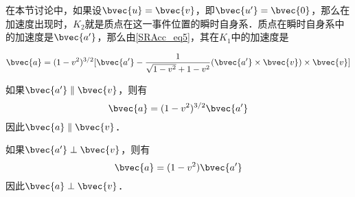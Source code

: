 在本节讨论中，如果设$\bvec{u}=\bvec{v}$，即$\bvec{u'}=\bvec{0}$，那么在加速度出现时，$K_2$就是质点在这一事件位置的瞬时自身系．质点在瞬时自身系中的加速度是$\bvec{a'}$，那么由\autoref{SRAcc_eq5}，其在$K_1$中的加速度是

\begin{equation}
\bvec{a}=(1-v^2)^{3/2}[\bvec{a'}-\frac{1}{\sqrt{1-v^2}+1-v^2}(\bvec{a'}\times\bvec{v})\times\bvec{v}]
\end{equation}

如果$\bvec{a'}\parallel \bvec{v}$，则有$$\bvec{a}=(1-v^2)^{3/2}\bvec{a'}$$因此$\bvec{a}\parallel\bvec{v}$．

如果$\bvec{a'}\perp \bvec{v}$，则有$$\bvec{a}=(1-v^2)\bvec{a'}$$因此$\bvec{a}\perp\bvec{v}$．


